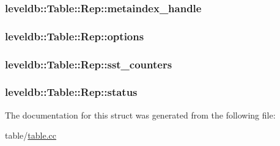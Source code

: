 \subsubsection[{metaindex\+\_\+handle}]{ leveldb\+::\+Table\+::\+Rep\+::metaindex\+\_\+handle}\label{structleveldb_1_1_table_1_1_rep_a11500653a2db8ba301bca5027a508789}
\hypertarget{structleveldb_1_1_table_1_1_rep_a96ff2b389369e1b0706b090961065740}{}
\subsubsection[{options}]{ leveldb\+::\+Table\+::\+Rep\+::options}\label{structleveldb_1_1_table_1_1_rep_a96ff2b389369e1b0706b090961065740}
\hypertarget{structleveldb_1_1_table_1_1_rep_acec6573abf3f5d015604af777debbc91}{}
\subsubsection[{sst\+\_\+counters}]{ leveldb\+::\+Table\+::\+Rep\+::sst\+\_\+counters}\label{structleveldb_1_1_table_1_1_rep_acec6573abf3f5d015604af777debbc91}
\hypertarget{structleveldb_1_1_table_1_1_rep_aceaddad6024db9f34af2358503e4c089}{}
\subsubsection[{status}]{ leveldb\+::\+Table\+::\+Rep\+::status}\label{structleveldb_1_1_table_1_1_rep_aceaddad6024db9f34af2358503e4c089}


The documentation for this struct was generated from the following file\+:\begin{DoxyCompactItemize}
\item 
table/\hyperlink{table_8cc}{table.\+cc}\end{DoxyCompactItemize}

